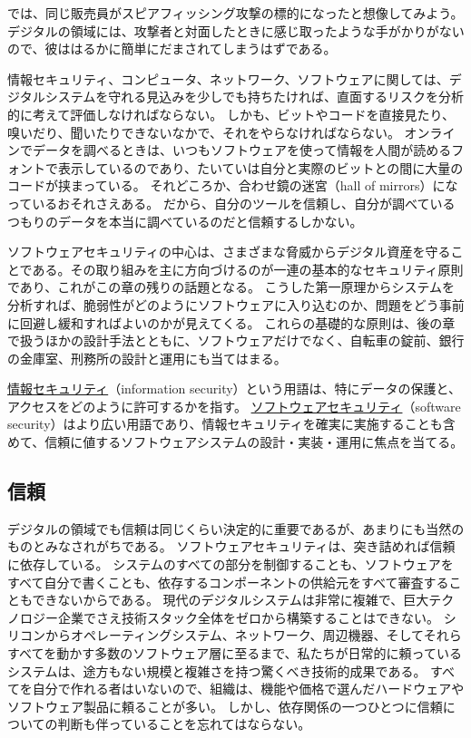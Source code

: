 \documentclass[uplatex]{jsarticle}
\def\label#1{}%
\begin{document}
では、同じ販売員がスピアフィッシング攻撃の標的になったと想像してみよう。
デジタルの領域には、攻撃者と対面したときに感じ取ったような手がかりがないので、彼ははるかに簡単にだまされてしまうはずである。

情報セキュリティ、コンピュータ、ネットワーク、ソフトウェアに関しては、デジタルシステムを守れる見込みを少しでも持ちたければ、直面するリスクを分析的に考えて評価しなければならない。
しかも、ビットやコードを直接見たり、嗅いだり、聞いたりできないなかで、それをやらなければならない。
オンラインでデータを調べるときは、いつもソフトウェアを使って情報を人間が読めるフォントで表示しているのであり、たいていは自分と実際のビットとの間に大量のコードが挟まっている。
それどころか、合わせ鏡の迷宮（hall of mirrors）になっているおそれさえある。
だから、自分のツールを信頼し、自分が調べているつもりのデータを本当に調べているのだと信頼するしかない。

ソフトウェアセキュリティの中心は、さまざまな脅威からデジタル資産を守ることである。その取り組みを主に方向づけるのが一連の基本的なセキュリティ原則であり、これがこの章の残りの話題となる。
こうした第一原理からシステムを分析すれば、脆弱性がどのようにソフトウェアに入り込むのか、問題をどう事前に回避し緩和すればよいのかが見えてくる。
これらの基礎的な原則は、後の章で扱うほかの設計手法とともに、ソフトウェアだけでなく、自転車の錠前、銀行の金庫室、刑務所の設計と運用にも当てはまる。

\begin{dfn}[情報セキュリティとソフトウェアセキュリティ]\label{dfn:ch1-information-software-security}
\underline{情報セキュリティ}（information security）という用語は、特にデータの保護と、アクセスをどのように許可するかを指す。
\underline{ソフトウェアセキュリティ}（software security）はより広い用語であり、情報セキュリティを確実に実施することも含めて、信頼に値するソフトウェアシステムの設計・実装・運用に焦点を当てる。
\end{dfn}

\subsection{信頼}

デジタルの領域でも信頼は同じくらい決定的に重要であるが、あまりにも当然のものとみなされがちである。
ソフトウェアセキュリティは、突き詰めれば信頼に依存している。
システムのすべての部分を制御することも、ソフトウェアをすべて自分で書くことも、依存するコンポーネントの供給元をすべて審査することもできないからである。
現代のデジタルシステムは非常に複雑で、巨大テクノロジー企業でさえ技術スタック全体をゼロから構築することはできない。
シリコンからオペレーティングシステム、ネットワーク、周辺機器、そしてそれらすべてを動かす多数のソフトウェア層に至るまで、私たちが日常的に頼っているシステムは、途方もない規模と複雑さを持つ驚くべき技術的成果である。
すべてを自分で作れる者はいないので、組織は、機能や価格で選んだハードウェアやソフトウェア製品に頼ることが多い。
しかし、依存関係の一つひとつに信頼についての判断も伴っていることを忘れてはならない。
\end{document}
